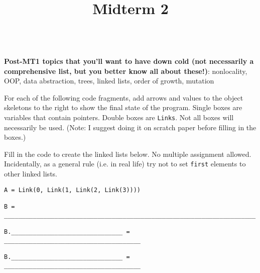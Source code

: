 \documentclass[twoside]{article}
\title{\sc Midterm 2}
\newcommand{\solutionimage}[2]{#2} %
\newcommand{\solutionimage}[2]{#1} %
\begin{document}
\thispagestyle{empty}
\maketitle

\leavevmode\\
\textbf{Post-MT1 topics that you'll want to have down cold (not necessarily a comprehensive list, but you better know all about these!)}: nonlocality, OOP, data abstraction, trees, linked lists, order of growth, mutation

\begin{enumerate}

For each of the following code fragments, add arrows and values to the object skeletons to the right to show the final state of the program.  Single boxes are variables that contain pointers.  Double boxes are \lstinline/Links/. Not all boxes will necessarily be used. (Note: I suggest doing it on scratch paper before filling in the boxes.)

\vspace{0.2in}

\solutionimage{}{}

\vspace{0.2in}

Fill in the code to create the linked lists below. No multiple assignment allowed. Incidentally, as a general rule (i.e. in real life) try not to set \texttt{first} elements to other linked lists.

\vspace{0.2in}



\vspace{0.2in}

\begin{lstlisting}
A = Link(0, Link(1, Link(2, Link(3))))

B = ______________________________________________________________________

B._______________________________ = ______________________________________

B._______________________________ = ______________________________________
\end{lstlisting}



\end{enumerate}
\end{document}
